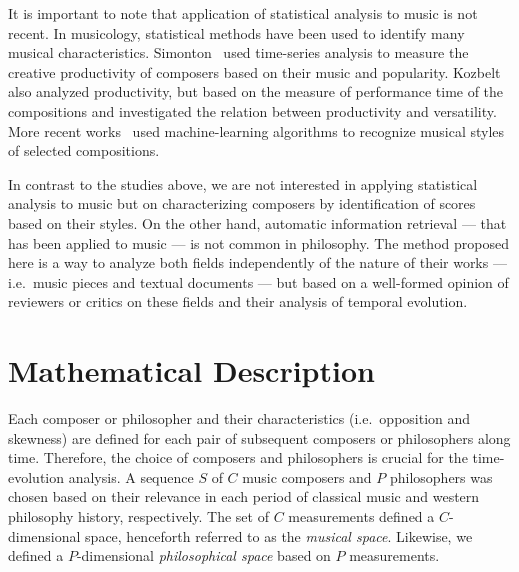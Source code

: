 \documentclass[
 aip,
 jmp,
 amsmath,amssymb,
 reprint,
]{revtex4-1}
\begin{document}
It is important to note that application of statistical analysis to
music is not recent. In musicology, statistical methods have been used
to identify many musical
characteristics. Simonton~\cite{Simonton1991829, Simonton1977791} used
time-series analysis to measure the creative productivity of composers
based on their music and popularity. Kozbelt~\cite{Kozbelt01012009,
  Kozbelt01012007} also analyzed productivity, but based on the
measure of performance time of the compositions and investigated the
relation between productivity and versatility. More recent
works~\cite{Kranenburg2004, Kranenburg2007} used machine-learning
algorithms to recognize musical styles of selected compositions.

In contrast to the studies above, we are not interested in applying
statistical analysis to music but on characterizing composers by
identification of scores based on their styles. On the other hand,
automatic information retrieval --- that has been applied to music ---
is not common in philosophy. The method proposed here is a way to
analyze both fields independently of the nature of their works ---
i.e.\ music pieces and textual documents --- but based on a
well-formed opinion of reviewers or critics on these fields and their
analysis of temporal evolution.

\section{Mathematical Description}

Each composer or philosopher and their characteristics
(i.e.\ opposition and skewness) are defined for each pair of
subsequent composers or philosophers along time. Therefore, the choice
of composers and philosophers is crucial for the time-evolution
analysis.  A sequence $S$ of $C$ music composers and $P$ philosophers
was chosen based on their relevance in each period of classical music
and western philosophy history, respectively. The set of $C$
measurements defined a $C$-dimensional space, henceforth referred to
as the \emph{musical space}. Likewise, we defined a $P$-dimensional
\emph{philosophical space} based on $P$ measurements.
\end{document}
